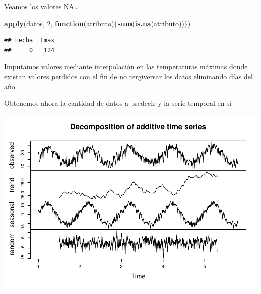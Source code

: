 \documentclass[]{article}
\newenvironment{Shaded}{\begin{snugshade}}{\end{snugshade}}
\newcommand{\KeywordTok}[1]{\textcolor[rgb]{0.13,0.29,0.53}{\textbf{#1}}}
\newcommand{\DataTypeTok}[1]{\textcolor[rgb]{0.13,0.29,0.53}{#1}}
\newcommand{\DecValTok}[1]{\textcolor[rgb]{0.00,0.00,0.81}{#1}}
\newcommand{\StringTok}[1]{\textcolor[rgb]{0.31,0.60,0.02}{#1}}
\newcommand{\CommentTok}[1]{\textcolor[rgb]{0.56,0.35,0.01}{\textit{#1}}}
\newcommand{\ControlFlowTok}[1]{\textcolor[rgb]{0.13,0.29,0.53}{\textbf{#1}}}
\newcommand{\OperatorTok}[1]{\textcolor[rgb]{0.81,0.36,0.00}{\textbf{#1}}}
\newcommand{\NormalTok}[1]{#1}
\begin{document}
Veamos los valores NA\ldots{}

\begin{Shaded}
\begin{Highlighting}[]
\KeywordTok{apply}\NormalTok{(datos, }\DecValTok{2}\NormalTok{, }\ControlFlowTok{function}\NormalTok{(atributo)\{}\KeywordTok{sum}\NormalTok{(}\KeywordTok{is.na}\NormalTok{(atributo))\})}
\end{Highlighting}
\end{Shaded}

\begin{verbatim}
## Fecha  Tmax 
##     0   124
\end{verbatim}

Imputamos valores mediante interpolación en las temperaturas máximas
donde existan valores perdidos con el fin de no tergiversar los datos
eliminando días del año.

\begin{Shaded}
\end{Shaded}

Obtenemos ahora la cantidad de datos a predecir y la serie temporal en
sí

\begin{Shaded}
\end{Shaded}

\includegraphics{exercise2_files/figure-latex/unnamed-chunk-5-1.pdf}
\end{document}
